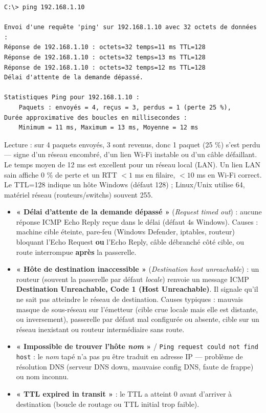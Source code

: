 \documentclass[11pt]{article}
\begin{document}
\begin{exemplebox}
\begin{lstlisting}
C:\> ping 192.168.1.10

Envoi d'une requête 'ping' sur 192.168.1.10 avec 32 octets de données :
Réponse de 192.168.1.10 : octets=32 temps=11 ms TTL=128
Réponse de 192.168.1.10 : octets=32 temps=13 ms TTL=128
Réponse de 192.168.1.10 : octets=32 temps=12 ms TTL=128
Délai d'attente de la demande dépassé.

Statistiques Ping pour 192.168.1.10 :
    Paquets : envoyés = 4, reçus = 3, perdus = 1 (perte 25 %),
Durée approximative des boucles en millisecondes :
    Minimum = 11 ms, Maximum = 13 ms, Moyenne = 12 ms
\end{lstlisting}
Lecture : sur 4 paquets envoyés, 3 sont revenus, donc 1 paquet (25 \%) s'est perdu — signe d'un réseau encombré, d'un lien Wi-Fi instable ou d'un câble défaillant. Le temps moyen de 12 ms est excellent pour un réseau local (LAN). Un lien LAN sain affiche 0 \% de perte et un RTT $< 1$ ms en filaire, $< 10$ ms en Wi-Fi correct. Le TTL=128 indique un hôte Windows (défaut 128) ; Linux/Unix utilise 64, matériel réseau (routeurs/switchs) souvent 255.
\end{exemplebox}

\begin{propriete}
\begin{itemize}
\item \textbf{« Délai d'attente de la demande dépassé »} (\emph{Request timed out}) : aucune réponse ICMP Echo Reply reçue dans le délai (défaut 4s Windows). Causes : machine cible éteinte, pare-feu (Windows Defender, iptables, routeur) bloquant l'Echo Request \textbf{ou} l'Echo Reply, câble débranché côté cible, ou route interrompue \textbf{après} la passerelle.
\item \textbf{« Hôte de destination inaccessible »} (\emph{Destination host unreachable}) : un routeur (souvent la passerelle par défaut \emph{locale}) renvoie un message ICMP \textbf{Destination Unreachable, Code 1 (Host Unreachable)}. Il signale qu'il ne sait pas atteindre le réseau de destination. Causes typiques : mauvais masque de sous-réseau sur l'émetteur (cible crue locale mais elle est distante, ou inversement), passerelle par défaut mal configurée ou absente, cible sur un réseau inexistant ou routeur intermédiaire sans route.
\item \textbf{« Impossible de trouver l'hôte \emph{nom} »} / \texttt{Ping request could not find host} : le \emph{nom} tapé n'a pas pu être traduit en adresse IP — problème de résolution DNS (serveur DNS down, mauvaise config DNS, faute de frappe) ou nom inconnu.
\item \textbf{« TTL expired in transit »} : le TTL a atteint 0 avant d'arriver à destination (boucle de routage ou TTL initial trop faible).
\end{itemize}
\end{propriete}
\end{document}
